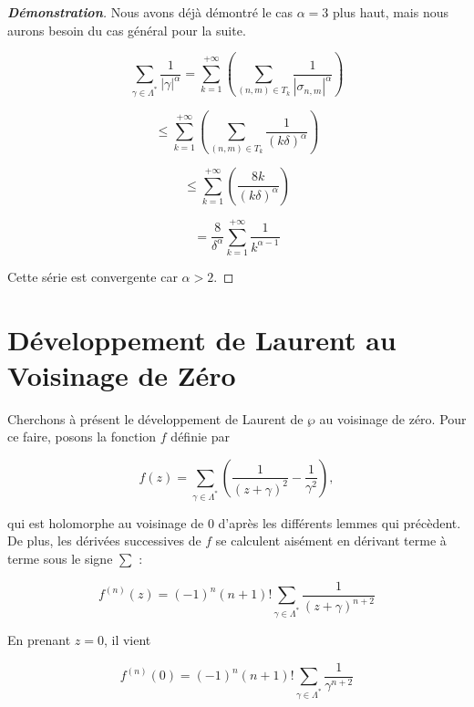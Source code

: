 \documentclass[12pt]{article}
\begin{document}
                \begin{proof}[\textbf{Démonstration}] 
                Nous avons déjà démontré le cas \(\alpha = 3\) plus haut, mais nous aurons besoin du cas général pour la suite.
                
                \[
                \sum_{\gamma \in \Lambda^*} \frac{1}{|\gamma|^\alpha} = \sum_{k=1}^{+\infty} \left( \sum_{(n,m) \in T_k} \frac{1}{|\sigma_{n,m}|^\alpha} \right)
                \]
                
                \[
                \leq \sum_{k=1}^{+\infty} \left( \sum_{(n,m) \in T_k} \frac{1}{(k\delta)^\alpha} \right)
                \]
                
                \[
                \leq \sum_{k=1}^{+\infty} \left( \frac{8k}{(k\delta)^\alpha} \right)
                \]
                
                \[
                = \frac{8}{\delta^\alpha} \sum_{k=1}^{+\infty} \frac{1}{k^{\alpha-1}}
                \]
                
                Cette série est convergente car \(\alpha > 2\).
                \end{proof}
                
                \section*{Développement de Laurent au Voisinage de Zéro}
                
                Cherchons à présent le développement de Laurent de \(\wp\) au voisinage de zéro. Pour ce faire, posons la fonction \(f\) définie par 
                
                \[
                f(z) = \sum_{\gamma \in \Lambda^*} \left( \frac{1}{(z+\gamma)^2} - \frac{1}{\gamma^2} \right),
                \]
                
                qui est holomorphe au voisinage de 0 d'après les différents lemmes qui précèdent. De plus, les dérivées successives de \(f\) se calculent aisément en dérivant terme à terme sous le signe \(\sum\) :
                
                \[
                f^{(n)}(z) = (-1)^n (n+1)! \sum_{\gamma \in \Lambda^*} \frac{1}{(z+\gamma)^{n+2}}
                \]
                
                En prenant \(z=0\), il vient
                
                \[
                f^{(n)}(0) = (-1)^n (n+1)! \sum_{\gamma \in \Lambda^*} \frac{1}{\gamma^{n+2}}
                \]
                
\end{document}
